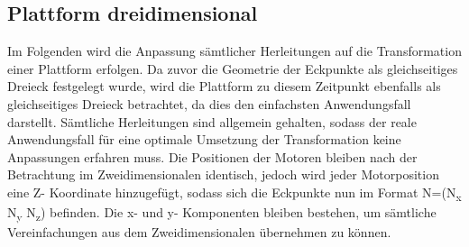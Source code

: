 \documentclass[12pt,titlepage]{article}
\begin{document}
		\subsection{Plattform dreidimensional}
			Im Folgenden wird die Anpassung sämtlicher Herleitungen auf die Transformation einer Plattform erfolgen. Da zuvor die Geometrie der Eckpunkte als gleichseitiges Dreieck festgelegt wurde, wird die Plattform zu diesem Zeitpunkt ebenfalls als gleichseitiges Dreieck betrachtet, da dies den einfachsten Anwendungsfall darstellt. Sämtliche Herleitungen sind allgemein gehalten, sodass der reale Anwendungsfall für eine optimale Umsetzung der Transformation keine Anpassungen erfahren muss.	
			Die Positionen der Motoren bleiben nach der Betrachtung im Zweidimensionalen identisch, jedoch wird jeder Motorposition eine Z- Koordinate hinzugefügt, sodass sich die Eckpunkte nun im Format N=(N\textsubscript{x} N\textsubscript{y} N\textsubscript{z}) befinden. Die x- und y- Komponenten bleiben bestehen, um sämtliche Vereinfachungen aus dem Zweidimensionalen übernehmen zu können.
\end{document}
